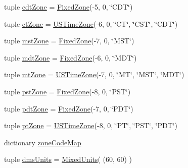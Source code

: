 \begin{DoxyCompactItemize}
\item 
tuple \hyperlink{namespaceamonpy_1_1sim_1_1sidereal_ad90a055931e7fb716b540ae1f0339ab5}{cdt\-Zone} = \hyperlink{classamonpy_1_1sim_1_1sidereal_1_1_fixed_zone}{Fixed\-Zone}(-\/5, 0, \char`\"{}C\-D\-T\char`\"{})
\item 
tuple \hyperlink{namespaceamonpy_1_1sim_1_1sidereal_a43bd98c47eb0b0647dc08ddad348459a}{ct\-Zone} = \hyperlink{classamonpy_1_1sim_1_1sidereal_1_1_u_s_time_zone}{U\-S\-Time\-Zone}(-\/6, 0, \char`\"{}C\-T\char`\"{}, \char`\"{}C\-S\-T\char`\"{}, \char`\"{}C\-D\-T\char`\"{})
\item 
tuple \hyperlink{namespaceamonpy_1_1sim_1_1sidereal_a34497c5b99af9d6762a3ca474aef4658}{mst\-Zone} = \hyperlink{classamonpy_1_1sim_1_1sidereal_1_1_fixed_zone}{Fixed\-Zone}(-\/7, 0, \char`\"{}M\-S\-T\char`\"{})
\item 
tuple \hyperlink{namespaceamonpy_1_1sim_1_1sidereal_a915285c8ea23cc18702c8c783c080355}{mdt\-Zone} = \hyperlink{classamonpy_1_1sim_1_1sidereal_1_1_fixed_zone}{Fixed\-Zone}(-\/6, 0, \char`\"{}M\-D\-T\char`\"{})
\item 
tuple \hyperlink{namespaceamonpy_1_1sim_1_1sidereal_aa9cbae5e2822246d12d6bca4aaf10043}{mt\-Zone} = \hyperlink{classamonpy_1_1sim_1_1sidereal_1_1_u_s_time_zone}{U\-S\-Time\-Zone}(-\/7, 0, \char`\"{}M\-T\char`\"{}, \char`\"{}M\-S\-T\char`\"{}, \char`\"{}M\-D\-T\char`\"{})
\item 
tuple \hyperlink{namespaceamonpy_1_1sim_1_1sidereal_a959f5a3bba85ba90d4efa5c021426171}{pst\-Zone} = \hyperlink{classamonpy_1_1sim_1_1sidereal_1_1_fixed_zone}{Fixed\-Zone}(-\/8, 0, \char`\"{}P\-S\-T\char`\"{})
\item 
tuple \hyperlink{namespaceamonpy_1_1sim_1_1sidereal_a5151d2554a093a90f7908e5e3dba4279}{pdt\-Zone} = \hyperlink{classamonpy_1_1sim_1_1sidereal_1_1_fixed_zone}{Fixed\-Zone}(-\/7, 0, \char`\"{}P\-D\-T\char`\"{})
\item 
tuple \hyperlink{namespaceamonpy_1_1sim_1_1sidereal_a1e8455573c3a0741ed720fd0534453ef}{pt\-Zone} = \hyperlink{classamonpy_1_1sim_1_1sidereal_1_1_u_s_time_zone}{U\-S\-Time\-Zone}(-\/8, 0, \char`\"{}P\-T\char`\"{}, \char`\"{}P\-S\-T\char`\"{}, \char`\"{}P\-D\-T\char`\"{})
\item 
dictionary \hyperlink{namespaceamonpy_1_1sim_1_1sidereal_a6cd8e6bf54dcd2fc71cbd9ff87c0189b}{zone\-Code\-Map}
\item 
tuple \hyperlink{namespaceamonpy_1_1sim_1_1sidereal_a96f3c1e64339d84582035c717708e859}{dms\-Units} = \hyperlink{classamonpy_1_1sim_1_1sidereal_1_1_mixed_units}{Mixed\-Units}( (60, 60) )

\end{DoxyCompactItemize}
